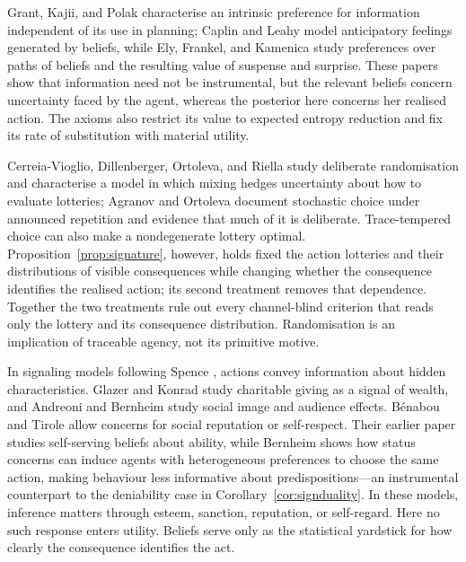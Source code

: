 \documentclass[11pt,a4paper]{article}
\theoremstyle{definition}
\newcommand{\1}{\mathbf 1}
\begin{document}
Grant, Kajii, and Polak \cite{GrantKajiiPolak1998} characterise an intrinsic preference for information
independent of its use in planning; Caplin and Leahy \cite{CaplinLeahy2001} model anticipatory feelings generated
by beliefs, while Ely, Frankel, and Kamenica \cite{ElyFrankelKamenica2015} study preferences over paths of beliefs
and the resulting value of suspense and surprise.  These papers show that information need not be instrumental,
but the relevant beliefs concern uncertainty faced by the agent, whereas the posterior here concerns her
realised action.  The axioms also restrict its value to expected entropy reduction and fix its rate of
substitution with material utility.

Cerreia-Vioglio, Dillenberger, Ortoleva, and Riella
\cite{CerreiaVioglioDillenbergerOrtolevaRiella2019} study deliberate randomisation and characterise a model in
which mixing hedges uncertainty about how to evaluate lotteries; Agranov and Ortoleva
\cite{AgranovOrtoleva2017} document stochastic choice under announced repetition and evidence that much of it is
deliberate.  Trace-tempered choice can also make a nondegenerate lottery optimal.
Proposition~\ref{prop:signature}, however, holds fixed the action lotteries and their distributions of visible
consequences while changing whether the consequence identifies the realised action; its second treatment removes
that dependence.  Together the two treatments rule out every channel-blind criterion that reads only the lottery
and its consequence distribution.  Randomisation is an implication of traceable agency, not its primitive
motive.

In signaling models following Spence \cite{Spence1973}, actions convey information about hidden characteristics.
Glazer and Konrad \cite{GlazerKonrad1996} study charitable giving as a signal of wealth, and Andreoni and Bernheim
\cite{AndreoniBernheim2009} study social image and audience effects.  B\'enabou and Tirole
\cite{BenabouTirole2006} allow concerns for social reputation or self-respect.  Their earlier paper
\cite{BenabouTirole2002} studies self-serving beliefs about ability, while Bernheim \cite{Bernheim1994} shows how
status concerns can induce agents with heterogeneous preferences to choose the same action, making behaviour less
informative about predispositions---an instrumental counterpart to the deniability case in
Corollary~\ref{cor:signduality}.  In these models, inference matters through esteem, sanction, reputation, or
self-regard.  Here no such response enters utility.  Beliefs serve only as the statistical yardstick for how
clearly the consequence identifies the act.
\end{document}
